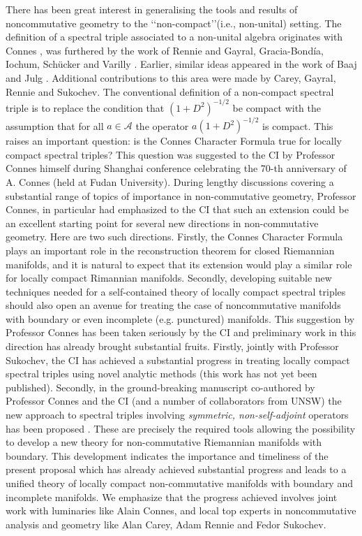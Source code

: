 \documentclass[12pt]{article}
\begin{document}
There has been great interest in generalising the tools and results of noncommutative geometry to the \lq\lq non-compact\rq\rq (i.e., non-unital) setting. The definition of a spectral triple associated to a non-unital algebra originates with Connes \cite{Connes-reality}, was furthered by the work of Rennie \cite{Rennie} and Gayral, Gracia-Bond\'ia, Iochum, Sch\"ucker and Varilly \cite{gayral-moyal}. Earlier, similar ideas appeared in the work of Baaj and Julg \cite{Baaj-Julg}. Additional contributions to this area were made by Carey, Gayral, Rennie and Sukochev\cite{CGRS}. The conventional definition  of a non-compact spectral triple is to replace the condition that $(1+D^2)^{-1/2}$ be compact with the assumption that for all $a \in \mathcal{A}$ the operator $a(1+D^2)^{-1/2}$ is compact. This raises an important question: is the Connes Character Formula true for locally compact spectral triples? This question was suggested to the CI by Professor Connes himself during Shanghai conference celebrating the 70-th anniversary of A. Connes (held at Fudan University). During lengthy discussions covering a substantial range of topics of importance in non-commutative geometry, Professor Connes, in particular had emphasized to the CI that such an extension could be an excellent starting point for several new directions in non-commutative geometry. Here are two such directions. Firstly, the Connes Character Formula plays  an important role in the reconstruction theorem for closed Riemannian manifolds, and it is natural to expect that its extension would play a similar role for locally compact Rimannian manifolds. Secondly, developing suitable new techniques needed for a self-contained theory of locally compact spectral triples should also open an avenue for treating the case of noncommutative manifolds with boundary or even incomplete (e.g. punctured) manifolds. This suggestion by Professor Connes has been taken seriously by the CI and preliminary work in this direction has already brought substantial fruits. Firstly, jointly with Professor Sukochev, the CI has achieved a substantial progress in treating locally compact spectral triples using novel analytic methods (this work has not yet been published). Secondly, in the ground-breaking manuscript co-authored by Professor Connes and the CI (and a number of collaborators from UNSW) the new approach to spectral triples involving {\it symmetric, non-self-adjoint} operators has been proposed \cite{Connes_team_symmetric}. These are precisely the required tools allowing the possibility to develop a new theory for non-commutative Riemannian manifolds with boundary. This development indicates the importance and timeliness of the present proposal which has already achieved substantial progress and leads to a unified theory of locally compact non-commutative manifolds with boundary and incomplete manifolds. We emphasize that the progress achieved involves joint work with luminaries like Alain Connes, and local top experts in noncommutative analysis and geometry like Alan Carey, Adam Rennie and Fedor Sukochev.
    
\end{document}
